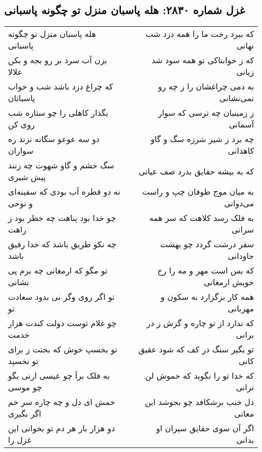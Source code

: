 \begin{center}
\section*{غزل شماره ۲۸۳۰: هله پاسبان منزل تو چگونه پاسبانی}
\label{sec:2830}
\begin{longtable}{l p{0.5cm} r}
هله پاسبان منزل تو چگونه پاسبانی
&&
که ببرد رخت ما را همه دزد شب نهانی
\\
بزن آب سرد بر رو بجه و بکن علالا
&&
که ز خوابناکی تو همه سود شد زیانی
\\
که چراغ دزد باشد شب و خواب پاسبانان
&&
به دمی چراغشان را ز چه رو نمی‌نشانی
\\
بگذار کاهلی را چو ستاره شب روی کن
&&
ز زمینیان چه ترسی که سوار آسمانی
\\
دو سه عوعو سگانه نزند ره سواران
&&
چه برد ز شیر شرزه سگ و گاو کاهدانی
\\
سگ خشم و گاو شهوت چه زنند پیش شیری
&&
که به بیشه حقایق بدرد صف عیانی
\\
نه دو قطره آب بودی که سفینه‌ای و نوحی
&&
به میان موج طوفان چپ و راست می‌دوانی
\\
چو خدا بود پناهت چه خطر بود ز راهت
&&
به فلک رسد کلاهت که سر همه سرانی
\\
چه نکو طریق باشد که خدا رفیق باشد
&&
سفر درشت گردد چو بهشت جاودانی
\\
تو مگو که ارمغانی چه برم پی نشانی
&&
که بس است مهر و مه را رخ خویش ارمغانی
\\
تو اگر روی وگر نی بدود سعادت تو
&&
همه کار برگزارد به سکون و مهربانی
\\
چو غلام توست دولت کندت هزار خدمت
&&
که ندارد از تو چاره و گرش ز در برانی
\\
تو بخسپ خوش که بختت ز برای تو نخسپد
&&
تو بگیر سنگ در کف که شود عقیق کانی
\\
به فلک برآ چو عیسی ارنی بگو چو موسی
&&
که خدا تو را نگوید که خموش لن ترانی
\\
خمش ای دل و چه چاره سر خم اگر بگیری
&&
دل خنب برشکافد چو بجوشد این معانی
\\
دو هزار بار هر دم تو بخوانی این غزل را
&&
اگر آن سوی حقایق سیران او بدانی
\\
\end{longtable}
\end{center}

